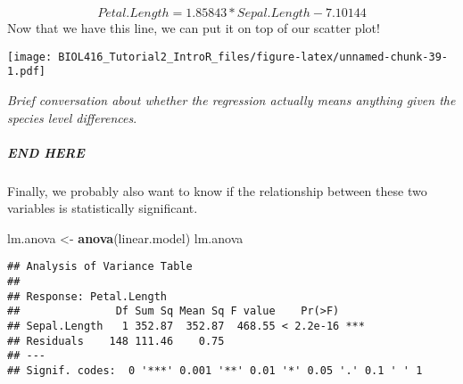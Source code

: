 \documentclass[]{article}
\newenvironment{Shaded}{\begin{snugshade}}{\end{snugshade}}
\newcommand{\KeywordTok}[1]{\textcolor[rgb]{0.13,0.29,0.53}{\textbf{#1}}}
\newcommand{\DataTypeTok}[1]{\textcolor[rgb]{0.13,0.29,0.53}{#1}}
\newcommand{\DecValTok}[1]{\textcolor[rgb]{0.00,0.00,0.81}{#1}}
\newcommand{\FloatTok}[1]{\textcolor[rgb]{0.00,0.00,0.81}{#1}}
\newcommand{\StringTok}[1]{\textcolor[rgb]{0.31,0.60,0.02}{#1}}
\newcommand{\CommentTok}[1]{\textcolor[rgb]{0.56,0.35,0.01}{\textit{#1}}}
\newcommand{\OperatorTok}[1]{\textcolor[rgb]{0.81,0.36,0.00}{\textbf{#1}}}
\newcommand{\NormalTok}[1]{#1}
\let\oldsubparagraph\subparagraph
\renewcommand{\subparagraph}[1]{\oldsubparagraph{#1}\mbox{}}
\begin{document}
\[
Petal.Length = 1.85843*Sepal.Length -7.10144
\] Now that we have this line, we can put it on top of our scatter plot!

\begin{Shaded}
\end{Shaded}

\texttt{[image: BIOL416\_Tutorial2\_IntroR\_files/figure-latex/unnamed-chunk-39-1.pdf]}

\emph{Brief conversation about whether the regression actually means
anything given the species level differences}.

\subparagraph{END HERE}\label{end-here}

Finally, we probably also want to know if the relationship between these
two variables is statistically significant.

\begin{Shaded}
\begin{Highlighting}[]
\NormalTok{lm.anova <-}\StringTok{ }\KeywordTok{anova}\NormalTok{(linear.model)}
\NormalTok{lm.anova}
\end{Highlighting}
\end{Shaded}

\begin{verbatim}
## Analysis of Variance Table
## 
## Response: Petal.Length
##               Df Sum Sq Mean Sq F value    Pr(>F)    
## Sepal.Length   1 352.87  352.87  468.55 < 2.2e-16 ***
## Residuals    148 111.46    0.75                      
## ---
## Signif. codes:  0 '***' 0.001 '**' 0.01 '*' 0.05 '.' 0.1 ' ' 1
\end{verbatim}
\end{document}
